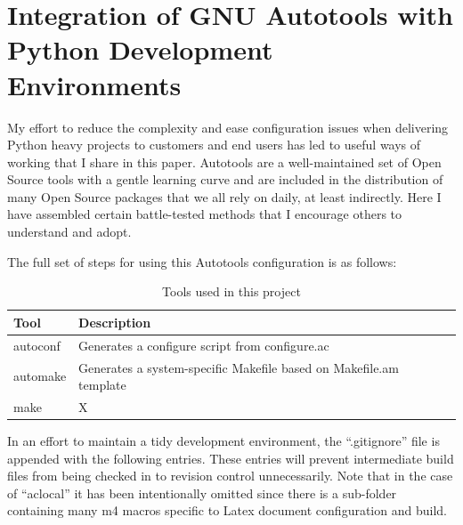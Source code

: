 






\section{\label{sec:Start}Integration of GNU Autotools with Python Development Environments}
\vspace{2mm}
\justifying
My effort to reduce the complexity and ease configuration issues when delivering Python heavy projects to customers and end users has led
to useful ways of working that I share in this paper. Autotools are a well-maintained set of Open Source tools with a gentle learning curve
and are included in the distribution of many Open Source packages that we all rely on daily, at least indirectly. Here I have assembled certain battle-tested methods that I encourage others to understand and adopt.

\justifying
The full set of steps for using this Autotools configuration is as follows:
\vspace{2mm}
\begin{table}[ht]
    \centering
    \begin{tabular}{|l|l|}\hline
        Tool & Description \\\hline
        autoconf & Generates a configure script from configure.ac   \\\hline
        automake & Generates a system-specific Makefile based on Makefile.am template    \\\hline
        make  &   X    \\\hline
    \end{tabular}
    \caption{Tools used in this project}
    \label{Autotools}
\end{table}
\vspace{2mm}


\justifying
In an effort to maintain a tidy development environment, the ``.gitignore'' file is appended with the following entries. These
entries will prevent intermediate build files from being checked in to revision control unnecessarily. Note that in the case
of ``aclocal'' it has been intentionally omitted since there is a sub-folder containing many m4 macros specific to Latex
document configuration and build.

